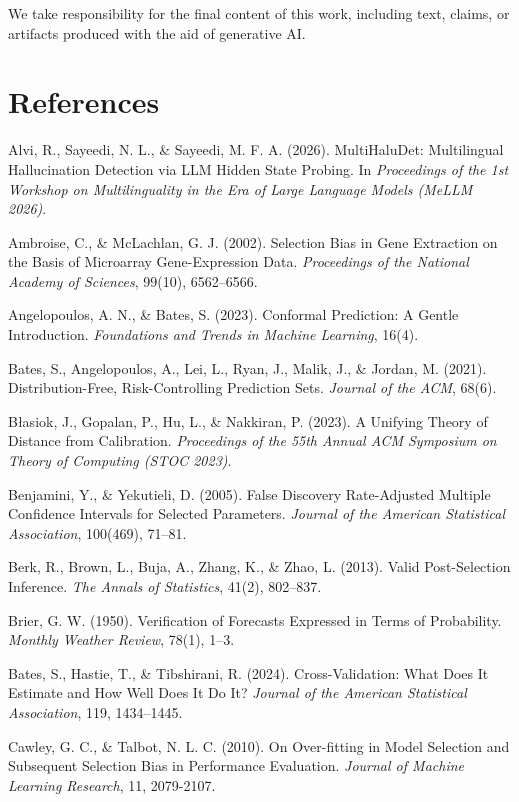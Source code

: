 \documentclass{article}
\begin{document}
We take responsibility for the final content of this work, including text,
claims, or artifacts produced with the aid of generative AI.





\section*{References}

Alvi, R., Sayeedi, N. L., \& Sayeedi, M. F. A. (2026). MultiHaluDet:
Multilingual Hallucination Detection via LLM Hidden State Probing. In
\emph{Proceedings of the 1st Workshop on Multilinguality in the Era of
Large Language Models (MeLLM 2026)}.

Ambroise, C., \& McLachlan, G. J. (2002). Selection Bias in Gene Extraction on
the Basis of Microarray Gene-Expression Data. \emph{Proceedings of the National
Academy of Sciences}, 99(10), 6562--6566.

Angelopoulos, A. N., \& Bates, S. (2023). Conformal Prediction: A Gentle
Introduction. \emph{Foundations and Trends in Machine Learning}, 16(4).

Bates, S., Angelopoulos, A., Lei, L., Ryan, J., Malik, J., \& Jordan, M.
(2021). Distribution-Free, Risk-Controlling Prediction Sets. \emph{Journal
of the ACM}, 68(6).

B\l{}asiok, J., Gopalan, P., Hu, L., \& Nakkiran, P. (2023). A Unifying Theory
of Distance from Calibration. \emph{Proceedings of the 55th Annual ACM
Symposium on Theory of Computing (STOC 2023)}.

Benjamini, Y., \& Yekutieli, D. (2005). False Discovery Rate-Adjusted
Multiple Confidence Intervals for Selected Parameters. \emph{Journal of the
American Statistical Association}, 100(469), 71--81.

Berk, R., Brown, L., Buja, A., Zhang, K., \& Zhao, L. (2013). Valid
Post-Selection Inference. \emph{The Annals of Statistics}, 41(2), 802--837.

Brier, G. W. (1950). Verification of Forecasts Expressed in Terms of
Probability. \emph{Monthly Weather Review}, 78(1), 1--3.

Bates, S., Hastie, T., \& Tibshirani, R. (2024). Cross-Validation: What Does
It Estimate and How Well Does It Do It? \emph{Journal of the American
Statistical Association}, 119, 1434--1445.

Cawley, G. C., \& Talbot, N. L. C. (2010). On Over-fitting in Model
Selection and Subsequent Selection Bias in Performance Evaluation.
\emph{Journal of Machine Learning Research}, 11, 2079-2107.
\end{document}
